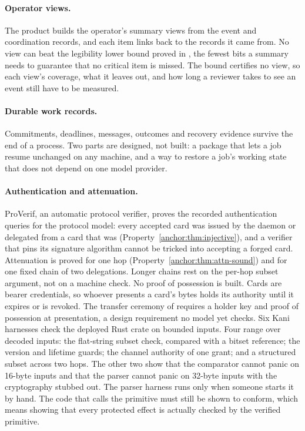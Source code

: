 \paragraph{Operator views.}
\pdstatus{\BuiltWeak}{}
The product builds the operator's summary views from the event and
coordination records, and each item links back to the records it came from.
No view can beat the legibility lower bound proved in , the fewest bits a summary needs to guarantee that no critical
item is missed. The bound certifies no view, so each view's coverage, what it
leaves out, and how long a reviewer takes to see an event still have to be
measured.

\paragraph{Durable work records.}
\pdstatus{\BuiltWeak}{}
Commitments, deadlines, messages, outcomes and recovery evidence survive the
end of a process. Two parts are designed, not built: a package that lets a job
resume unchanged on any machine, and a way to restore a job's working state
that does not depend on one model provider.

\paragraph{Authentication and attenuation.}
ProVerif, an automatic protocol verifier, proves the recorded authentication
queries for the protocol model: every accepted card was issued by the daemon or
delegated from a card that was (Property~\ref{anchor:thm:injective}), and a
verifier that pins its signature algorithm cannot be tricked into accepting a
forged card. Attenuation is proved for one hop
(Property~\ref{anchor:thm:attn-sound}) and for one fixed chain of two
delegations. Longer chains rest on the per-hop subset argument, not on a
machine check. No proof of possession is built. Cards are bearer credentials,
so whoever presents a card's bytes holds its authority until it expires or is
revoked. The transfer ceremony of 
requires a holder key and proof of possession at presentation, a design
requirement no model yet checks. Six Kani harnesses check the deployed Rust crate on bounded inputs.
Four range over decoded inputs: the flat-string subset check, compared with a
bitset reference; the version and lifetime guards; the channel authority of
one grant; and a structured subset across two hops. The other two show that
the comparator cannot panic on 16-byte inputs and that the parser cannot panic
on 32-byte inputs with the cryptography stubbed out. The parser harness runs
only when someone starts it by hand. The code that calls the primitive must
still be shown to conform, which means showing that every protected effect is
actually checked by the verified primitive.

